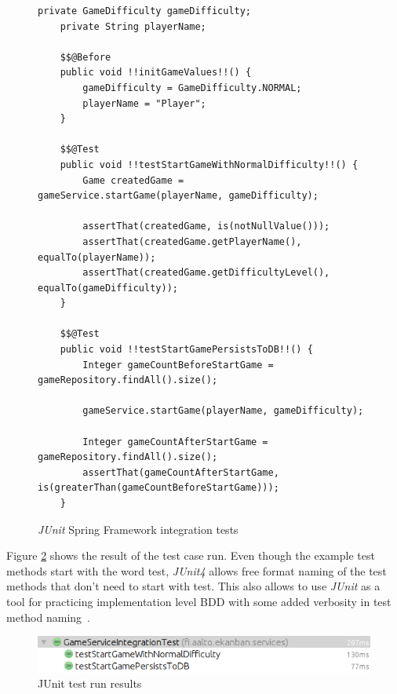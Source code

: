     \begin{figure}[H]
        \begin{lstlisting}[style=java]
    private GameDifficulty gameDifficulty;
    private String playerName;

    $$@Before
    public void !!initGameValues!!() {
        gameDifficulty = GameDifficulty.NORMAL;
        playerName = "Player";
    }

    $$@Test
    public void !!testStartGameWithNormalDifficulty!!() {
        Game createdGame = gameService.startGame(playerName, gameDifficulty);

        assertThat(createdGame, is(notNullValue()));
        assertThat(createdGame.getPlayerName(), equalTo(playerName));
        assertThat(createdGame.getDifficultyLevel(), equalTo(gameDifficulty));
    }

    $$@Test
    public void !!testStartGamePersistsToDB!!() {
        Integer gameCountBeforeStartGame = gameRepository.findAll().size();

        gameService.startGame(playerName, gameDifficulty);

        Integer gameCountAfterStartGame = gameRepository.findAll().size();
        assertThat(gameCountAfterStartGame, is(greaterThan(gameCountBeforeStartGame)));
    }
        \end{lstlisting}
        \caption{\textit{JUnit} Spring Framework integration tests}
        \label{fig:junit-examples}
    \end{figure}

    Figure \ref{fig:junit-result} shows the result of the test case run. Even though the example test methods start with the word test,
    \textit{JUnit4} allows free format naming of the test methods that don't need to start with test. This also allows to use \textit{JUnit} as a tool for practicing
    implementation level BDD with some added verbosity in test method naming~\cite{smart2014bdd}.

    \begin{figure}[H]
      \begin{center}
        \begin{topbot}[style=mdstyle]
        \includegraphics[width=\textwidth]{images/junit-result.png}
        \end{topbot}
        \caption{JUnit test run results}
        \label{fig:junit-result}
      \end{center}
    \end{figure}

